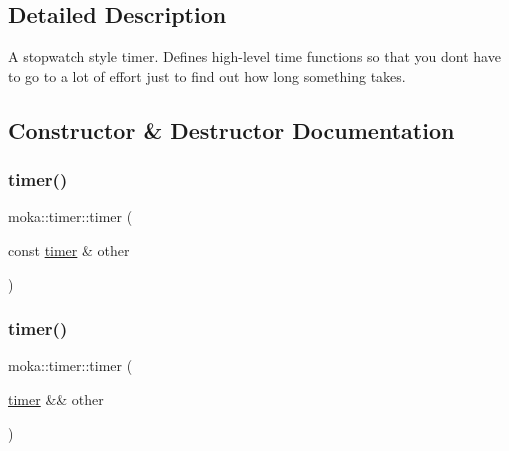 \subsection{Detailed Description}
A stopwatch style timer. Defines high-\/level time functions so that you don\textquotesingle{}t have to go to a lot of effort just to find out how long something takes. 

\subsection{Constructor \& Destructor Documentation}
\mbox{\label{classmoka_1_1timer_a5149e986b24529d0dbb8f5ab2f0f19a6}} 
\subsubsection{\texorpdfstring{timer()}{timer()}\hspace{0.1cm}{\footnotesize\ttfamily [1/3]}}
{\footnotesize\ttfamily moka\+::timer\+::timer (\begin{DoxyParamCaption}\item[{const \mbox{\hyperlink{classmoka_1_1timer}{timer}} \&}]{other }\end{DoxyParamCaption})\hspace{0.3cm}{\ttfamily [default]}}

\mbox{\label{classmoka_1_1timer_a527fcdb18531598d937ba2b193c4fdbc}} 
\subsubsection{\texorpdfstring{timer()}{timer()}\hspace{0.1cm}{\footnotesize\ttfamily [2/3]}}
{\footnotesize\ttfamily moka\+::timer\+::timer (\begin{DoxyParamCaption}\item[{\mbox{\hyperlink{classmoka_1_1timer}{timer}} \&\&}]{other }\end{DoxyParamCaption})\hspace{0.3cm}{\ttfamily [default]}}

\mbox{\label{classmoka_1_1timer_ab78e8d9acc9e7577e3fa0db5fb3dde07}} 
